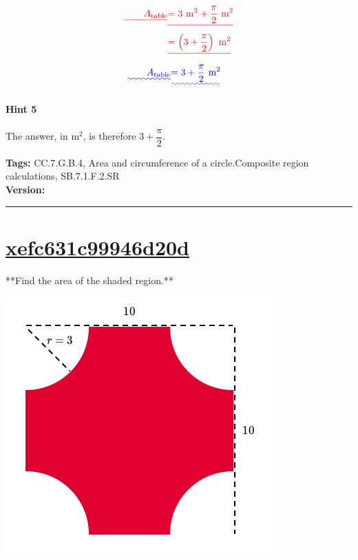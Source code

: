 \documentclass[twocolumn,10pt]{article}
\def\shrinkfactor{0.45}
\begin{document}
\DIFdelbegin \begin{eqnarray*}\DIFdel{
\qquad A_{\text{table}} 
}&\DIFdel{= 3\text{ m}^2 + \dfrac{\pi}{2} \text{ m}^2 }\\
&\DIFdel{= \left(3+\dfrac{\pi}{2}\right)\text{ m}^2
}\end{eqnarray*}
\DIFdelend \DIFaddbegin \begin{align*}\DIFadd{
\qquad A_{\text{table}} 
 }&\DIFadd{= 3+\dfrac{\pi}{2}\text{ m}^2
}\end{align*}
\DIFaddend 

\paragraph{Hint 5}The answer, in $\text{m}^2$, is therefore $3+\dfrac{\pi}{2}$.




\medskip
\noindent
\textbf{Tags:} {\footnotesize CC.7.G.B.4, Area and circumference of a circle.Composite region calculations, SB.7.1.F.2.SR}\\
\textbf{Version:} \DIFdelbegin {}\DIFdelend \DIFaddbegin {}\DIFaddend \smallskip\hrule





\section{\href{https://www.khanacademy.org/devadmin/content/items/xefc631c99946d20d}{xefc631c99946d20d}}

\noindent
**Find the area of the shaded region.**


\DIFdelbegin \DIFdelend \DIFaddbegin \includegraphics[scale=\shrinkfactor]{figures/4c530c13b712fc74d6235bb9b86c385ff381328d.png}
\DIFaddend 
\end{document}
